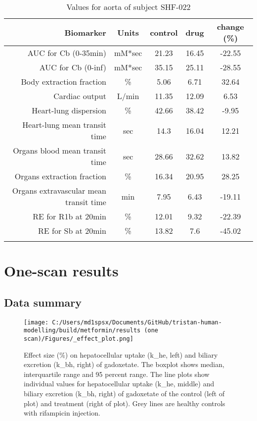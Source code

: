 \documentclass{epflreport}%
\begin{document}
\begin{longtable}{rcccc}%
\hline%
Biomarker&Units&control&drug&change (\%)\\%
\hline%
AUC for Cb (0{-}35min)&mM*sec&21.23&16.45&{-}22.55\\%
AUC for Cb (0{-}inf)&mM*sec&35.15&25.11&{-}28.55\\%
Body extraction fraction&\%&5.06&6.71&32.64\\%
Cardiac output&L/min&11.35&12.09&6.53\\%
Heart{-}lung dispersion&\%&42.66&38.42&{-}9.95\\%
Heart{-}lung mean transit time&sec&14.3&16.04&12.21\\%
Organs blood mean transit time&sec&28.66&32.62&13.82\\%
Organs extraction fraction&\%&16.34&20.95&28.25\\%
Organs extravascular mean transit time&min&7.95&6.43&{-}19.11\\%
RE for R1b at 20min&\%&12.01&9.32&{-}22.39\\%
RE for Sb at 20min&\%&13.82&7.6&{-}45.02\\%
\hline%
\caption{Values for aorta of subject SHF-022} \\%
\end{longtable}%
\clearpage%
\chapter{One{-}scan results}%
\section{Data summary}%
\label{sec:Datasummary}%

%


\begin{figure}[h!]%
\centering%
\texttt{[image: C:/Users/md1spsx/Documents/GitHub/tristan-human-modelling/build/metformin/results (one scan)/Figures/\_effect\_plot.png]}%
\caption{Effect size (\%) on hepatocellular uptake (k\_he, left) and biliary excretion (k\_bh, right) of gadoxetate. The boxplot shows median, interquartile range and 95 percent range. The line plots show individual values for hepatocellular uptake (k\_he, middle) and biliary excretion (k\_bh, right) of gadoxetate of the control (left of plot) and treatment (right of plot). Grey lines are healthy controls with rifampicin injection.}%
\end{figure}
\end{document}
